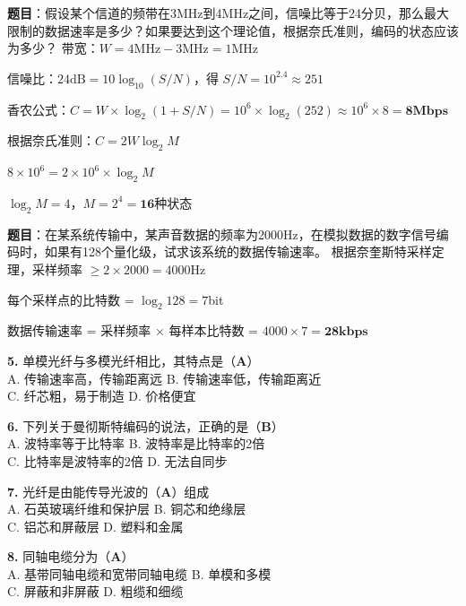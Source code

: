 \begin{examplebox}
\textbf{题目}：假设某个信道的频带在3MHz到4MHz之间，信噪比等于24分贝，那么最大限制的数据速率是多少？如果要达到这个理论值，根据奈氏准则，编码的状态应该为多少？
\tcblower
带宽：$W = 4\text{MHz} - 3\text{MHz} = 1\text{MHz}$

信噪比：$24\text{dB} = 10\log_{10}(S/N)$，得 $S/N = 10^{2.4} \approx 251$

香农公式：$C = W \times \log_2(1 + S/N) = 10^6 \times \log_2(252) \approx 10^6 \times 8 = \textbf{8Mbps}$

根据奈氏准则：$C = 2W\log_2 M$

$8 \times 10^6 = 2 \times 10^6 \times \log_2 M$

$\log_2 M = 4$，$M = 2^4 = \textbf{16}$种状态
\end{examplebox}

\begin{examplebox}
\textbf{题目}：在某系统传输中，某声音数据的频率为2000Hz，在模拟数据的数字信号编码时，如果有128个量化级，试求该系统的数据传输速率。
\tcblower
根据奈奎斯特采样定理，采样频率 $\geq 2 \times 2000 = 4000$Hz

每个采样点的比特数 = $\log_2 128 = 7$bit

数据传输速率 = 采样频率 × 每样本比特数 = $4000 \times 7 = \textbf{28kbps}$
\end{examplebox}


\begin{examplebox}[选择题（续）]
\textbf{5.} 单模光纤与多模光纤相比，其特点是（\textbf{A}）\\
A. 传输速率高，传输距离远 \quad B. 传输速率低，传输距离近\\
C. 纤芯粗，易于制造 \quad D. 价格便宜

\textbf{6.} 下列关于曼彻斯特编码的说法，正确的是（\textbf{B}）\\
A. 波特率等于比特率 \quad B. 波特率是比特率的2倍\\
C. 比特率是波特率的2倍 \quad D. 无法自同步

\textbf{7.} 光纤是由能传导光波的（\textbf{A}）组成\\
A. 石英玻璃纤维和保护层 \quad B. 铜芯和绝缘层\\
C. 铝芯和屏蔽层 \quad D. 塑料和金属

\textbf{8.} 同轴电缆分为（\textbf{A}）\\
A. 基带同轴电缆和宽带同轴电缆 \quad B. 单模和多模\\
C. 屏蔽和非屏蔽 \quad D. 粗缆和细缆
\end{examplebox}

